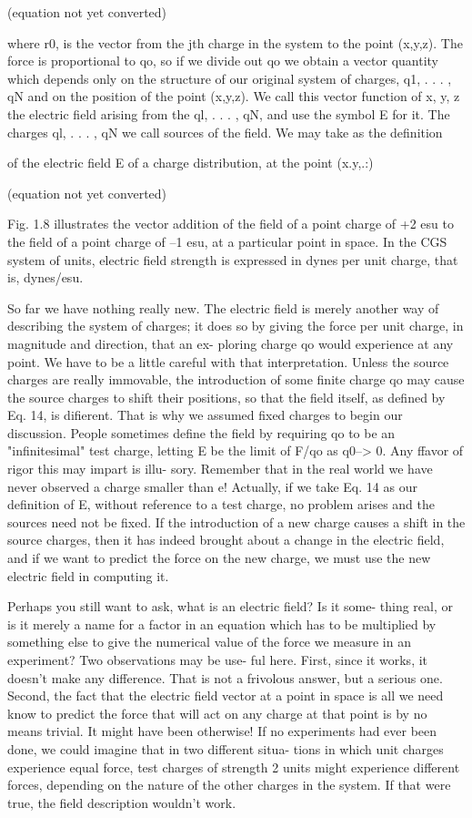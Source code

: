 (equation not yet converted)

where r0, is the vector from the jth charge in the system to the point
(x,y,z). The force is proportional to qo, so if we divide out qo we
obtain a vector quantity which depends only on the structure of our
original system of charges, q1, . . . , qN and on the position of the point
(x,y,z). We call this vector function of x, y, z the electric field arising
from the ql, . . . , qN, and use the symbol E for it. The charges
ql, . . . , qN we call sources of the field. We may take as the definition

of the electric field E of a charge distribution, at the point (x.y,.:)

(equation not yet converted)

Fig. 1.8 illustrates the vector addition of the field of a point charge
of +2 esu to the field of a point charge of --1 esu, at a particular
point in space. In the CGS system of units, electric field strength is
expressed in dynes per unit charge, that is, dynes/esu.

So far we have nothing really new. The electric field is merely
another way of describing the system of charges; it does so by giving
the force per unit charge, in magnitude and direction, that an ex-
ploring charge qo would experience at any point. We have to be a
little careful with that interpretation. Unless the source charges are
really immovable, the introduction of some finite charge qo may
cause the source charges to shift their positions, so that the field itself,
as defined by Eq. 14, is difierent. That is why we assumed fixed
charges to begin our discussion. People sometimes define the field
by requiring qo to be an "infinitesimal" test charge, letting E be the
limit of F/qo as q0--> 0. Any ffavor of rigor this may impart is illu-
sory. Remember that in the real world we have never observed a
charge smaller than e! Actually, if we take Eq. 14 as our definition
of E, without reference to a test charge, no problem arises and the
sources need not be fixed. If the introduction of a new charge
causes a shift in the source charges, then it has indeed brought about
a change in the electric field, and if we want to predict the force on
the new charge, we must use the new electric field in computing it.

Perhaps you still want to ask, what is an electric field? Is it some-
thing real, or is it merely a name for a factor in an equation which has
to be multiplied by something else to give the numerical value of the
force we measure in an experiment? Two observations may be use-
ful here. First, since it works, it doesn't make any difference. That
is not a frivolous answer, but a serious one. Second, the fact that
the electric field vector at a point in space is all we need know to
predict the force that will act on any charge at that point is by no
means trivial. It might have been otherwise! If no experiments
had ever been done, we could imagine that in two different situa-
tions in which unit charges experience equal force, test charges of
strength 2 units might experience different forces, depending on the
nature of the other charges in the system. If that were true, the field
description wouldn't work.

